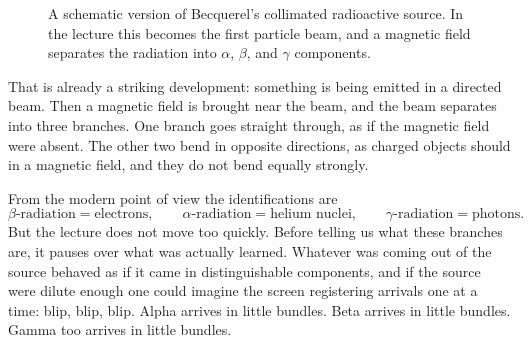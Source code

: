 \begin{figure}[h]
\centering
{}
\caption{A schematic version of Becquerel's collimated radioactive source. In the lecture this becomes the first particle beam, and a magnetic field separates the radiation into \(\alpha\), \(\beta\), and \(\gamma\) components.}
\end{figure}

That is already a striking development: something is being emitted in a directed beam. Then a magnetic field is brought near the beam, and the beam separates into three branches. One branch goes straight through, as if the magnetic field were absent. The other two bend in opposite directions, as charged objects should in a magnetic field, and they do not bend equally strongly.

From the modern point of view the identifications are
\begin{equation}
\beta\text{-radiation}=\text{electrons},\qquad
\alpha\text{-radiation}=\text{helium nuclei},\qquad
\gamma\text{-radiation}=\text{photons}.
\end{equation}
But the lecture does not move too quickly. Before telling us what these branches are, it pauses over what was actually learned. Whatever was coming out of the source behaved as if it came in distinguishable components, and if the source were dilute enough one could imagine the screen registering arrivals one at a time: blip, blip, blip. Alpha arrives in little bundles. Beta arrives in little bundles. Gamma too arrives in little bundles.

